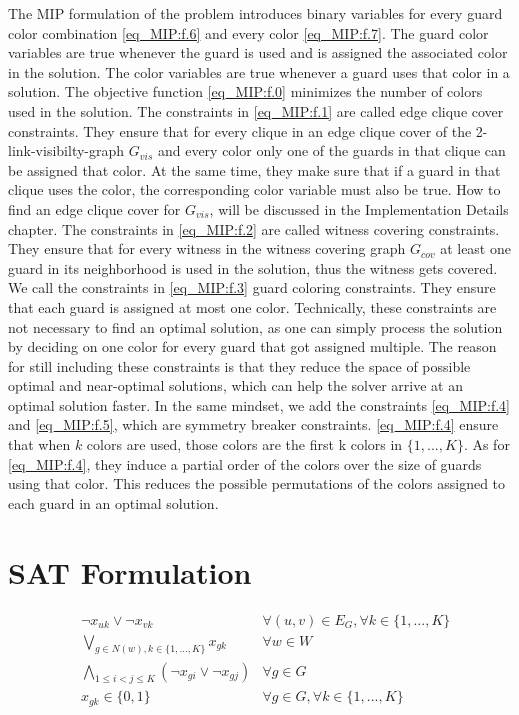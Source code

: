 The MIP formulation of the problem introduces binary variables for every guard color combination \cref{eq_MIP:f.6} and every color \cref{eq_MIP:f.7}. The guard color variables are true whenever the guard is used and is assigned the associated color in the solution. The color variables are true whenever a guard uses that color in a solution. The objective function \cref{eq_MIP:f.0} minimizes the number of colors used in the solution. The constraints in \cref{eq_MIP:f.1} are called edge clique cover constraints. They ensure that for every clique in an edge clique cover of the 2-link-visibilty-graph $G_{vis}$ and every color only one of the guards in that clique can be assigned that color. At the same time, they make sure that if a guard in that clique uses the color, the corresponding color variable must also be true. How to find an edge clique cover for $G_{vis}$, will be discussed in the Implementation Details chapter. The constraints in \cref{eq_MIP:f.2} are called witness covering constraints. They ensure that for every witness in the witness covering graph $G_{cov}$ at least one guard in its neighborhood is used in the solution, thus the witness gets covered. We call the constraints in \cref{eq_MIP:f.3} guard coloring constraints. They ensure that each guard is assigned at most one color. Technically, these constraints are not necessary to find an optimal solution, as one can simply process the solution by deciding on one color for every guard that got assigned multiple. The reason for still including these constraints is that they reduce the space of possible optimal and near-optimal solutions, which can help the solver arrive at an optimal solution faster. In the same mindset, we add the constraints \cref{eq_MIP:f.4} and \cref{eq_MIP:f.5}, which are symmetry breaker constraints. \cref{eq_MIP:f.4} ensure that when $k$ colors are used, those colors are the first k colors in $\{1,...,K\}$. As for \cref{eq_MIP:f.4}, they induce a partial order of the colors over the size of guards using that color. This reduces the possible permutations of the colors assigned to each guard in an optimal solution.

\section{SAT Formulation}

\begin{align}
\label{eq_SAT:f.0}&\lnot x_{uk} \lor \lnot x_{vk} & \forall (u,v)\in E_{G}, \forall k\in \{1,...,K\}\\
\label{eq_SAT:f.1}&\bigvee_{g\in N(w), k\in \{1,...,K\}}x_{gk} & \forall w\in W\\
\label{eq_SAT:f.2}&\bigwedge_{1 \leq i < j \leq K} (\lnot x_{gi} \lor \lnot x_{gj}) & \forall g\in G\\
\label{eq:_SATf.3}& x_{gk} \in \{0,1\} & \forall g\in G, \forall k\in \{1,...,K\}
\end{align}

